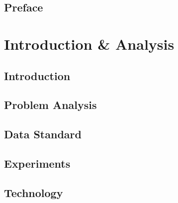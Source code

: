 \cleardoublepage
{}
\pagestyle{fancy} %

\setcounter{tocdepth}{1}
\tableofcontents

\chapter*{Preface}

\newpage{}

\part{Introduction \& Analysis}

\chapter{Introduction}


\chapter{Problem Analysis}




%
%



%
%


\chapter{Data Standard}



\chapter{Experiments}



\chapter{Technology}


